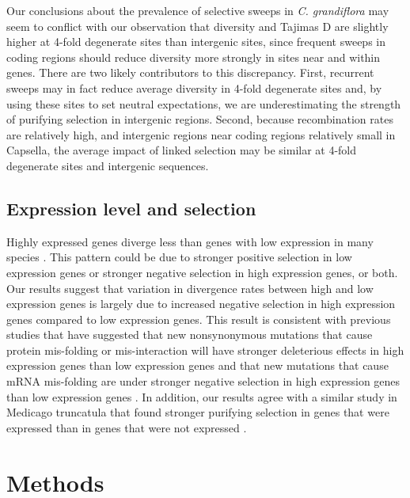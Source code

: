 Our conclusions about the prevalence of selective sweeps in \textit{C. grandiflora} may seem to conflict with our observation that diversity and Tajima\textsc{}s D are slightly higher at 4-fold degenerate sites than intergenic sites, since frequent sweeps in coding regions should reduce diversity more strongly in sites near and within genes. There are two likely contributors to this discrepancy. First, recurrent sweeps may in fact reduce average diversity in 4-fold degenerate sites and, by using these sites to set neutral expectations, we are underestimating the strength of purifying selection in intergenic regions. Second, because recombination rates are relatively high, and intergenic regions near coding regions relatively small in Capsella, the average impact of linked selection may be similar at 4-fold degenerate sites and intergenic sequences. 

\subsection{Expression level and selection}
	Highly expressed genes diverge less than genes with low expression in many species \citep{pal2001, subramanian2004, drummond2006,slotte2011genomic, yang2012, lemos2005,clark2007, carneiro2012}. This pattern could be due to stronger positive selection in low expression genes or stronger negative selection in high expression genes, or both. Our results suggest that variation in divergence rates between high and low expression genes is largely due to increased negative selection in high expression genes compared to low expression genes. This result is consistent with previous studies that have suggested that new nonsynonymous mutations that cause protein mis-folding or mis-interaction will have stronger deleterious effects in high expression genes than low expression genes and that new mutations that cause mRNA mis-folding are under stronger negative selection in high expression genes than low expression genes \citep{park2013, yang2012, drummond2008}. In addition, our results agree with a similar study in Medicago truncatula that found stronger purifying selection in genes that were expressed than in genes that were not expressed \citep{paape2013}. 


\section{Methods}
